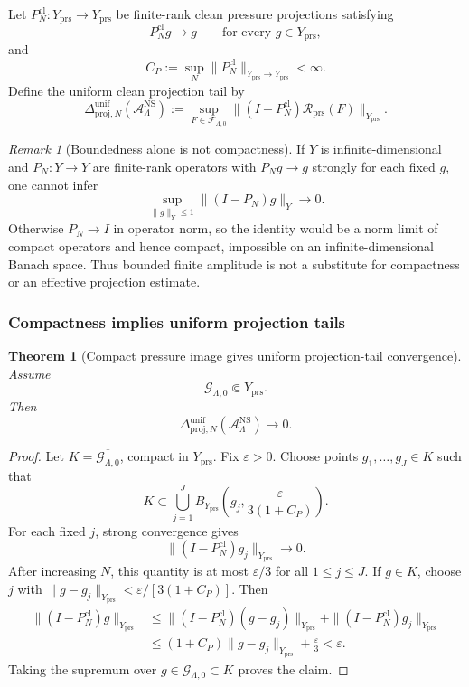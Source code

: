 \documentclass[11pt]{article}
\numberwithin{equation}{section}
\newtheorem{theorem}{Theorem}[section]
\theoremstyle{definition}
\theoremstyle{remark}
\newtheorem{remark}[remark]{Remark}
\newcommand{\NS}{\mathrm{NS}}
\newcommand{\cl}{\mathrm{cl}}
\begin{document}
Let \(P_N^{\cl}:Y_{\mathrm{prs}}\to Y_{\mathrm{prs}}\) be finite-rank clean
pressure projections satisfying
\[
    P_N^{\cl}g\to g
    \qquad\text{for every }g\in Y_{\mathrm{prs}},
\]
and
\[
    C_P:=\sup_N\|P_N^{\cl}\|_{Y_{\mathrm{prs}}\to Y_{\mathrm{prs}}}<\infty.
\]
Define the uniform clean projection tail by
\[
    \Delta_{\mathrm{proj},N}^{\mathrm{unif}}
    (\mathcal A_{\Lambda}^{\NS})
    :=
    \sup_{F\in\mathcal F_{\Lambda,0}}
    \|(I-P_N^{\cl})\mathcal R_{\mathrm{prs}}(F)\|_{Y_{\mathrm{prs}}}.
\]

\begin{remark}[Boundedness alone is not compactness]
\label{rem:boundedness-not-compactness}
If \(Y\) is infinite-dimensional and \(P_N:Y\to Y\) are finite-rank operators
with \(P_Ng\to g\) strongly for each fixed \(g\), one cannot infer
\[
    \sup_{\|g\|_Y\le1}\|(I-P_N)g\|_Y\to0.
\]
Otherwise \(P_N\to I\) in operator norm, so the identity would be a norm limit
of compact operators and hence compact, impossible on an infinite-dimensional
Banach space.  Thus bounded finite amplitude is not a substitute for compactness
or an effective projection estimate.
\end{remark}

\subsubsection{Compactness implies uniform projection tails}

\begin{theorem}[Compact pressure image gives uniform projection-tail convergence]
\label{thm:compact-pressure-image-tail}
Assume
\[
    \mathcal G_{\Lambda,0}\Subset Y_{\mathrm{prs}}.
\]
Then
\[
    \Delta_{\mathrm{proj},N}^{\mathrm{unif}}
    (\mathcal A_{\Lambda}^{\NS})
    \to0.
\]
\end{theorem}

\begin{proof}
Let \(K=\overline{\mathcal G_{\Lambda,0}}\), compact in \(Y_{\mathrm{prs}}\).
Fix \(\varepsilon>0\).  Choose points \(g_1,\ldots,g_J\in K\) such that
\[
    K\subset
    \bigcup_{j=1}^J
    B_{Y_{\mathrm{prs}}}
    \left(g_j,\frac{\varepsilon}{3(1+C_P)}\right).
\]
For each fixed \(j\), strong convergence gives
\[
    \|(I-P_N^{\cl})g_j\|_{Y_{\mathrm{prs}}}\to0.
\]
After increasing \(N\), this quantity is at most \(\varepsilon/3\) for all
\(1\le j\le J\).  If \(g\in K\), choose \(j\) with
\(\|g-g_j\|_{Y_{\mathrm{prs}}}<\varepsilon/[3(1+C_P)]\).  Then
\[
\begin{aligned}
    \|(I-P_N^{\cl})g\|_{Y_{\mathrm{prs}}}
    &\le
    \|(I-P_N^{\cl})(g-g_j)\|_{Y_{\mathrm{prs}}}
    +
    \|(I-P_N^{\cl})g_j\|_{Y_{\mathrm{prs}}}\\
    &\le
    (1+C_P)\|g-g_j\|_{Y_{\mathrm{prs}}}
    +
    \frac{\varepsilon}{3}
    <
    \varepsilon.
\end{aligned}
\]
Taking the supremum over \(g\in\mathcal G_{\Lambda,0}\subset K\) proves the
claim.
\end{proof}
\end{document}
